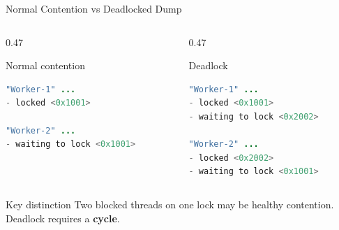 \documentclass[aspectratio=169,11pt]{beamer}
\begin{document}
	\begin{frame}[fragile]{Normal Contention vs Deadlocked Dump}
		\begin{columns}[T]
			\begin{column}{0.47\textwidth}
				\begin{block}{Normal contention}
					\begin{lstlisting}[language=Java]
"Worker-1" ...
- locked <0x1001>
						
"Worker-2" ...
- waiting to lock <0x1001>
					\end{lstlisting}
				\end{block}
			\end{column}
			\begin{column}{0.47\textwidth}
				\begin{block}{Deadlock}
					\begin{lstlisting}[language=Java]
"Worker-1" ...
- locked <0x1001>
- waiting to lock <0x2002>
						
"Worker-2" ...
- locked <0x2002>
- waiting to lock <0x1001>
					\end{lstlisting}
				\end{block}
			\end{column}
		\end{columns}
		
		\vspace{0.3cm}
		\begin{alertblock}{Key distinction}
			Two blocked threads on one lock may be healthy contention.  
			Deadlock requires a \textbf{cycle}.
		\end{alertblock}
	\end{frame}
	
\end{document}
